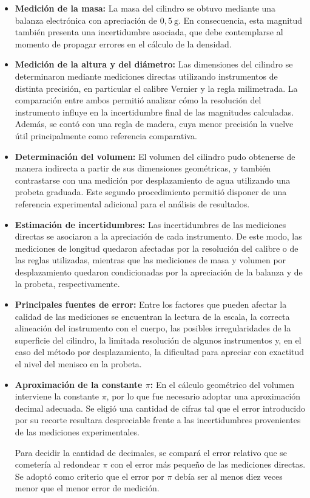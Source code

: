 \begin{itemize}
    \item \textbf{Medición de la masa:} La masa del cilindro se obtuvo mediante una balanza electrónica con apreciación de $0{,}5\ \mathrm{g}$. En consecuencia, esta magnitud también presenta una incertidumbre asociada, que debe contemplarse al momento de propagar errores en el cálculo de la densidad.

    \item \textbf{Medición de la altura y del diámetro:} Las dimensiones del cilindro se determinaron mediante mediciones directas utilizando instrumentos de distinta precisión, en particular el calibre Vernier y la regla milimetrada. La comparación entre ambos permitió analizar cómo la resolución del instrumento influye en la incertidumbre final de las magnitudes calculadas. Además, se contó con una regla de madera, cuya menor precisión la vuelve útil principalmente como referencia comparativa.

    \item \textbf{Determinación del volumen:} El volumen del cilindro pudo obtenerse de manera indirecta a partir de sus dimensiones geométricas, y también contrastarse con una medición por desplazamiento de agua utilizando una probeta graduada. Este segundo procedimiento permitió disponer de una referencia experimental adicional para el análisis de resultados.

    \item \textbf{Estimación de incertidumbres:} Las incertidumbres de las mediciones directas se asociaron a la apreciación de cada instrumento. De este modo, las mediciones de longitud quedaron afectadas por la resolución del calibre o de las reglas utilizadas, mientras que las mediciones de masa y volumen por desplazamiento quedaron condicionadas por la apreciación de la balanza y de la probeta, respectivamente.

    \item \textbf{Principales fuentes de error:} Entre los factores que pueden afectar la calidad de las mediciones se encuentran la lectura de la escala, la correcta alineación del instrumento con el cuerpo, las posibles irregularidades de la superficie del cilindro, la limitada resolución de algunos instrumentos y, en el caso del método por desplazamiento, la dificultad para apreciar con exactitud el nivel del menisco en la probeta.

    \item \textbf{Aproximación de la constante $\pi$:} En el cálculo geométrico del volumen interviene la constante $\pi$, por lo que fue necesario adoptar una aproximación decimal adecuada. Se eligió una cantidad de cifras tal que el error introducido por su recorte resultara despreciable frente a las incertidumbres provenientes de las mediciones experimentales. 
    
    Para decidir la cantidad de decimales, se compará el error relativo que se cometería al redondear $\pi$ con el error más pequeño de las mediciones directas. Se adoptó como criterio que el error por $\pi$ debía ser al menos diez veces menor que el menor error de medición.
\end{itemize}

